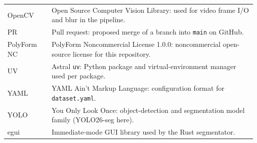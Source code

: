 {\begin{tabular}{@{}p{}p{}@{}}
OpenCV & Open Source Computer Vision Library: used for video frame I/O and blur in the pipeline. \\
PR & Pull request: proposed merge of a branch into \texttt{main} on GitHub. \\
PolyForm NC & PolyForm Noncommercial License 1.0.0: noncommercial open-source license for this repository. \\
UV & Astral \texttt{uv}: Python package and virtual-environment manager used per package. \\
YAML & YAML Ain't Markup Language: configuration format for \texttt{dataset.yaml}. \\
YOLO & You Only Look Once: object-detection and segmentation model family (YOLO26-seg here). \\
egui & Immediate-mode GUI library used by the Rust segmentator. \\
\end{tabular}
}

